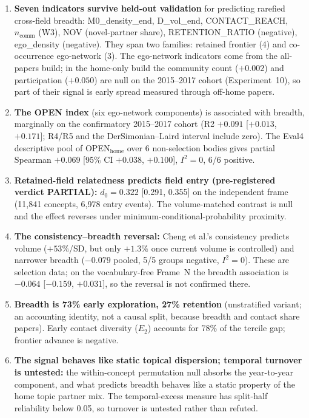 \documentclass[11pt,letterpaper]{article}
\begin{document}
\begin{enumerate}
    \item \textbf{Seven indicators survive held-out validation} for predicting rarefied cross-field breadth: M0\_density\_end, D\_vol\_end, CONTACT\_REACH, $n_{\text{comm}}$ (W3), NOV (novel-partner share), RETENTION\_RATIO (negative), ego\_density (negative). They span two families: retained frontier (4) and co-occurrence ego-network (3). The ego-network indicators come from the all-papers build; in the home-only build the community count ($+0.002$) and participation ($+0.050$) are null on the 2015--2017 cohort (Experiment~10), so part of their signal is early spread measured through off-home papers.

    \item \textbf{The OPEN index} (six ego-network components) is associated with breadth, marginally on the confirmatory 2015--2017 cohort (R2 $+0.091$ [$+0.013$, $+0.171$]; R4/R5 and the DerSimonian--Laird interval include zero). The Eval4 descriptive pool of OPEN$_{\text{home}}$ over 6 non-selection bodies gives partial Spearman $+0.069$ [95\% CI $+0.038$, $+0.100$], $I^2 = 0$, 6/6 positive.

    \item \textbf{Retained-field relatedness predicts field entry (pre-registered verdict PARTIAL):} $d_0 = 0.322$ [0.291, 0.355] on the independent frame (11{,}841 concepts, 6{,}978 entry events). The volume-matched contrast is null and the effect reverses under minimum-conditional-probability proximity.

    \item \textbf{The consistency--breadth reversal:} Cheng et al.'s consistency predicts volume ($+53\%$/SD, but only $+1.3\%$ once current volume is controlled) and narrower breadth ($-0.079$ pooled, 5/5 groups negative, $I^2 = 0$). These are selection data; on the vocabulary-free Frame~N the breadth association is $-0.064$ [$-0.159$, $+0.031$], so the reversal is not confirmed there.

    \item \textbf{Breadth is 73\% early exploration, 27\% retention} (unstratified variant; an accounting identity, not a causal split, because breadth and contact share papers). Early contact diversity ($E_2$) accounts for 78\% of the tercile gap; frontier advance is negative.

    \item \textbf{The signal behaves like static topical dispersion; temporal turnover is untested:} the within-concept permutation null absorbs the year-to-year component, and what predicts breadth behaves like a static property of the home topic partner mix. The temporal-excess measure has split-half reliability below 0.05, so turnover is untested rather than refuted.
\end{enumerate}
\end{document}
